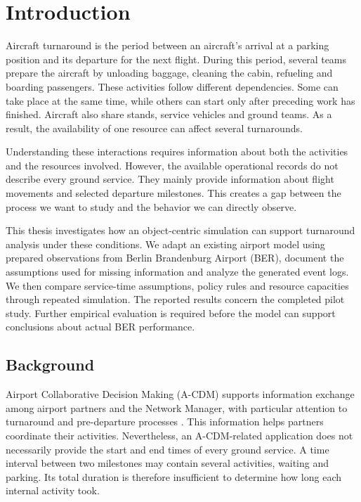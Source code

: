 \chapter{Introduction}
\label{ch:intro}

Aircraft turnaround is the period between an aircraft's arrival at a parking position and its departure for the next flight. During this period, several teams prepare the aircraft by unloading baggage, cleaning the cabin, refueling and boarding passengers. These activities follow different dependencies. Some can take place at the same time, while others can start only after preceding work has finished. Aircraft also share stands, service vehicles and ground teams. As a result, the availability of one resource can affect several turnarounds.

Understanding these interactions requires information about both the activities and the resources involved. However, the available operational records do not describe every ground service. They mainly provide information about flight movements and selected departure milestones. This creates a gap between the process we want to study and the behavior we can directly observe.

This thesis investigates how an object-centric simulation can support turnaround analysis under these conditions. We adapt an existing airport model using prepared observations from Berlin Brandenburg Airport (BER), document the assumptions used for missing information and analyze the generated event logs. We then compare service-time assumptions, policy rules and resource capacities through repeated simulation. The reported results concern the completed pilot study. Further empirical evaluation is required before the model can support conclusions about actual BER performance.

\section{Background}
Airport Collaborative Decision Making (A-CDM) supports information exchange among airport partners and the Network Manager, with particular attention to turnaround and pre-departure processes \cite{eurocontrol_acdm}. This information helps partners coordinate their activities. Nevertheless, an A-CDM-related application does not necessarily provide the start and end times of every ground service. A time interval between two milestones may contain several activities, waiting and parking. Its total duration is therefore insufficient to determine how long each internal activity took.

